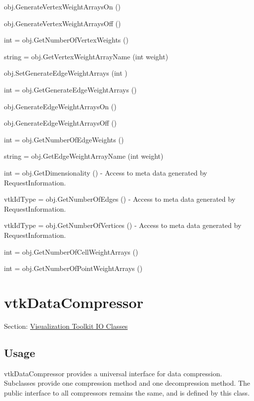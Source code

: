 \begin{DoxyItemize}
\item {\ttfamily obj.\-Generate\-Vertex\-Weight\-Arrays\-On ()}  
\item {\ttfamily obj.\-Generate\-Vertex\-Weight\-Arrays\-Off ()}  
\item {\ttfamily int = obj.\-Get\-Number\-Of\-Vertex\-Weights ()}  
\item {\ttfamily string = obj.\-Get\-Vertex\-Weight\-Array\-Name (int weight)}  
\item {\ttfamily obj.\-Set\-Generate\-Edge\-Weight\-Arrays (int )}  
\item {\ttfamily int = obj.\-Get\-Generate\-Edge\-Weight\-Arrays ()}  
\item {\ttfamily obj.\-Generate\-Edge\-Weight\-Arrays\-On ()}  
\item {\ttfamily obj.\-Generate\-Edge\-Weight\-Arrays\-Off ()}  
\item {\ttfamily int = obj.\-Get\-Number\-Of\-Edge\-Weights ()}  
\item {\ttfamily string = obj.\-Get\-Edge\-Weight\-Array\-Name (int weight)}  
\item {\ttfamily int = obj.\-Get\-Dimensionality ()} -\/ Access to meta data generated by Request\-Information.  
\item {\ttfamily vtk\-Id\-Type = obj.\-Get\-Number\-Of\-Edges ()} -\/ Access to meta data generated by Request\-Information.  
\item {\ttfamily vtk\-Id\-Type = obj.\-Get\-Number\-Of\-Vertices ()} -\/ Access to meta data generated by Request\-Information.  
\item {\ttfamily int = obj.\-Get\-Number\-Of\-Cell\-Weight\-Arrays ()}  
\item {\ttfamily int = obj.\-Get\-Number\-Of\-Point\-Weight\-Arrays ()}  
\end{DoxyItemize}\hypertarget{vtkio_vtkdatacompressor}{}\section{vtk\-Data\-Compressor}\label{vtkio_vtkdatacompressor}
Section\-: \hyperlink{sec_vtkio}{Visualization Toolkit I\-O Classes} \hypertarget{vtkwidgets_vtkxyplotwidget_Usage}{}\subsection{Usage}\label{vtkwidgets_vtkxyplotwidget_Usage}
vtk\-Data\-Compressor provides a universal interface for data compression. Subclasses provide one compression method and one decompression method. The public interface to all compressors remains the same, and is defined by this class.

